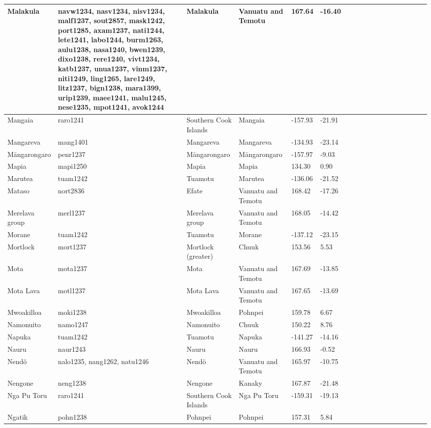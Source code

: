 \documentclass[draft,10pt]{article} %
\begin{document}
\begin{landscape}
\begin{longtable}{| p{2.5cm} |  p{7cm} | p{2.5cm}  | p{2.5cm}  | p{2.5cm}  | p{2.5cm}  | p{2.5cm}  | p{2cm}  | p{1cm} | p{1cm}  | p{1cm} | p{1cm}  | p{1.5cm}  | p{1cm} | p{1cm}  | p{1cm}  |p{1cm}  | p{1cm}    |}
 Malakula & navw1234, nasv1234, nisv1234, malf1237, sout2857, mask1242, port1285, axam1237, nati1244, lete1241, labo1244, burm1263, aulu1238, nasa1240, bwen1239, dixo1238, rere1240, vivt1234, katb1237, unua1237, vinm1237, niti1249, ling1265, lare1249, litz1237, bign1238, mara1399, urip1239, maee1241, malu1245, nese1235, mpot1241, avok1244 & Malakula & Vanuatu and Temotu & 167.64 & -16.40 \\ \hline
 Mangaia & raro1241 & Southern Cook Islands & Mangaia & -157.93 & -21.91 \\ \hline
 Mangareva & mang1401 & Mangareva & Mangareva & -134.93 & -23.14 \\ \hline
 M\={a}ngarongaro & penr1237 & M\={a}ngarongaro & M\={a}ngarongaro & -157.97 & -9.03 \\ \hline
 Mapia & mapi1250 & Mapia & Mapia & 134.30 & 0.90 \\ \hline
 Marutea & tuam1242 & Tuamotu & Marutea & -136.06 & -21.52 \\ \hline
 Mataso & nort2836 & Efate & Vanuatu and Temotu & 168.42 & -17.26 \\ \hline
 Merelava group & merl1237 & Merelava group & Vanuatu and Temotu & 168.05 & -14.42 \\ \hline
 Morane & tuam1242 & Tuamotu & Morane & -137.12 & -23.15 \\ \hline
 Mortlock & mort1237 & Mortlock (greater) & Chuuk & 153.56 & 5.53 \\ \hline
 Mota & mota1237 & Mota & Vanuatu and Temotu & 167.69 & -13.85 \\ \hline
 Mota Lava & motl1237 & Mota Lava & Vanuatu and Temotu & 167.65 & -13.69 \\ \hline
 Mwoakilloa & moki1238 & Mwoakilloa & Pohnpei & 159.78 & 6.67 \\ \hline
 Namonuito & namo1247 & Namonuito & Chuuk & 150.22 & 8.76 \\ \hline
 Napuka & tuam1242 & Tuamotu & Napuka & -141.27 & -14.16 \\ \hline
 Nauru & naur1243 & Nauru & Nauru & 166.93 & -0.52 \\ \hline
 Nendö & nalo1235, nang1262, natu1246 & Nendö & Vanuatu and Temotu & 165.97 & -10.75 \\ \hline
 Nengone & neng1238 & Nengone & Kanaky & 167.87 & -21.48 \\ \hline
 Nga Pu Toru & raro1241 & Southern Cook Islands & Nga Pu Toru & -159.31 & -19.13 \\ \hline
 Ngatik & pohn1238 & Pohnpei & Pohnpei & 157.31 & 5.84 \\ \hline

\end{longtable}
\end{landscape}
\end{document}
